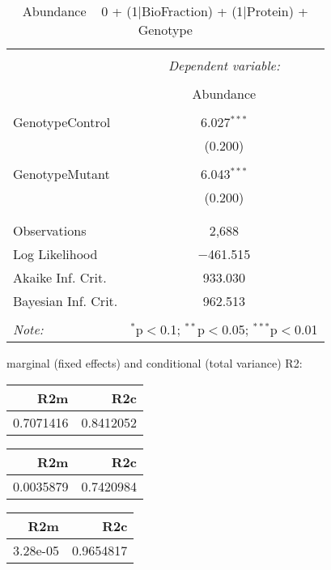 \documentclass[11pt]{report}
\begin{document}
\begin{table}[!htbp] \centering 
  \caption{Abundance ~ 0 + (1|BioFraction) + (1|Protein) + Genotype} 
  \label{} 
\begin{tabular}{@{\extracolsep{5pt}}lc} 
\\[-1.8ex]\hline 
\hline \\[-1.8ex] 
 & \multicolumn{1}{c}{\textit{Dependent variable:}} \\ 
\cline{2-2} 
\\[-1.8ex] & Abundance \\ 
\hline \\[-1.8ex] 
 GenotypeControl & 6.027$^{***}$ \\ 
  & (0.200) \\ 
  & \\ 
 GenotypeMutant & 6.043$^{***}$ \\ 
  & (0.200) \\ 
  & \\ 
\hline \\[-1.8ex] 
Observations & 2,688 \\ 
Log Likelihood & $-$461.515 \\ 
Akaike Inf. Crit. & 933.030 \\ 
Bayesian Inf. Crit. & 962.513 \\ 
\hline 
\hline \\[-1.8ex] 
\textit{Note:}  & \multicolumn{1}{r}{$^{*}$p$<$0.1; $^{**}$p$<$0.05; $^{***}$p$<$0.01} \\ 
\end{tabular} 
\end{table} 
marginal (fixed effects) and conditional (total variance) R2:

\begin{tabular}{r|r}
\hline
R2m & R2c\\
\hline
0.7071416 & 0.8412052\\
\hline
\end{tabular}

\begin{tabular}{r|r}
\hline
R2m & R2c\\
\hline
0.0035879 & 0.7420984\\
\hline
\end{tabular}

\begin{tabular}{r|r}
\hline
R2m & R2c\\
\hline
3.28e-05 & 0.9654817\\
\hline
\end{tabular}
\end{document}
